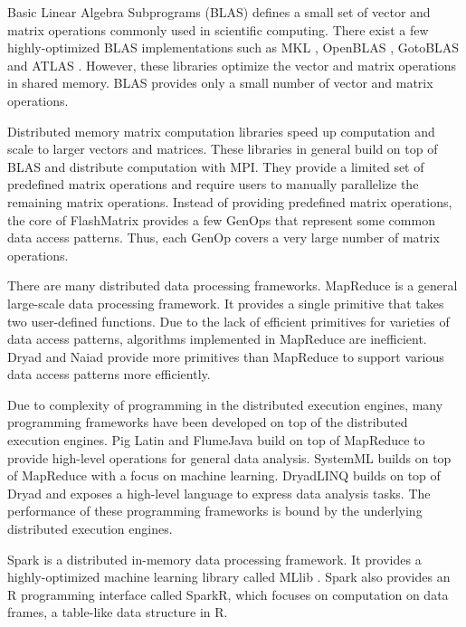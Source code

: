Basic Linear Algebra Subprograms (BLAS) defines a small set of vector and
matrix operations commonly used in scientific computing. There exist a few
highly-optimized BLAS implementations such as MKL \cite{mkl}, OpenBLAS
\cite{openblas}, GotoBLAS \cite{Goto} and ATLAS \cite{atlas}. However, these
libraries optimize the vector and matrix operations in shared memory. BLAS
provides only a small number of vector and matrix operations.

Distributed memory matrix computation libraries \cite{trilinos, petsc, elemental}
speed up computation and scale to larger vectors and matrices. These libraries
in general build on top of BLAS and distribute computation with MPI.
They provide a limited set of predefined matrix operations and
require users to manually parallelize the remaining matrix operations. Instead
of providing predefined matrix operations, the core of FlashMatrix provides
a few GenOps that represent some common data access patterns. Thus,
each GenOp covers a very large number of matrix operations.

There are many distributed data processing frameworks.
MapReduce \cite{mapreduce} is a general large-scale data processing framework.
It provides a single primitive that takes two user-defined functions. 
Due to the lack of
efficient primitives for varieties of data access patterns, algorithms
implemented in MapReduce are inefficient. Dryad \cite{dryad} and
Naiad \cite{naiad} provide more primitives than MapReduce to support various
data access patterns more efficiently.

Due to complexity of programming in the distributed execution engines, many
programming frameworks have been developed on top of the distributed execution
engines. Pig Latin \cite{pig} and FlumeJava \cite{flumejava} build on top of
MapReduce to provide high-level operations for general data analysis. SystemML
\cite{systemml} builds on top of MapReduce with a focus on machine learning.
DryadLINQ \cite{dryadlinq} builds on top of Dryad and exposes a high-level
language to express data analysis tasks. The performance of these programming
frameworks is bound by the underlying distributed execution engines.

Spark \cite{spark} is a distributed in-memory data processing framework.
It provides a highly-optimized machine learning library called MLlib \cite{mllib}.
Spark also provides an R programming interface called SparkR, which
focuses on computation on data frames, a table-like data structure in R.

